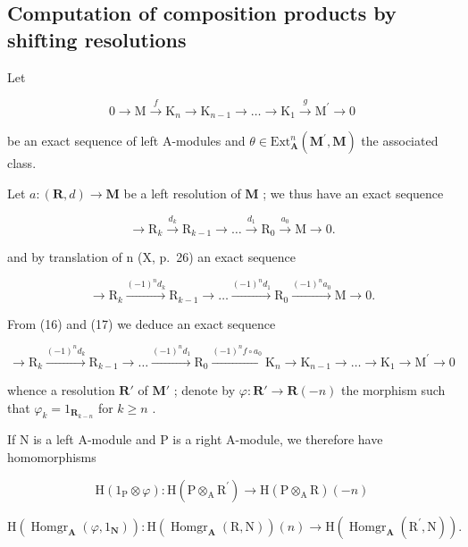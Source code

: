 \subsection{Computation of composition products by shifting resolutions}

Let

\[
0 \rightarrow \mathrm{M} \xrightarrow {f} \mathrm{K} _ {n} \rightarrow \mathrm{K} _ {n - 1} \rightarrow \dots \rightarrow \mathrm{K} _ {1} \xrightarrow {g} \mathrm{M} ^ {\prime} \rightarrow 0\tag{16}
\]

be an exact sequence of left A-modules and \(\theta\in\mathrm{Ext}_{\mathbf{A}}^{n}(\mathbf{M}^{\prime},\mathbf{M})\) the associated class.

Let \(a:(\mathbf{R},d)\to \mathbf{M}\) be a left resolution of \(\mathbf{M}\) ; we thus have an exact sequence

\[
\rightarrow \mathrm{R} _ {k} \xrightarrow {d _ {k}} \mathrm{R} _ {k - 1} \rightarrow \dots \xrightarrow {d _ {1}} \mathrm{R} _ {0} \xrightarrow {a _ {0}} \mathrm{M} \rightarrow 0.
\]

and by translation of n (X, p.~26) an exact sequence

\[
\rightarrow \mathrm{R} _ {k} \xrightarrow {(- 1) ^ {n} d _ {k}} \mathrm{R} _ {k - 1} \rightarrow \dots \xrightarrow {(- 1) ^ {n} d _ {1}} \mathrm{R} _ {0} \xrightarrow {(- 1) ^ {n} a _ {0}} \mathrm{M} \rightarrow 0.\tag{17}
\]

From (16) and (17) we deduce an exact sequence

\[
\rightarrow \mathrm{R} _ {k} \xrightarrow {(- 1) ^ {n} d _ {k}} \mathrm{R} _ {k - 1} \rightarrow \dots \xrightarrow {(- 1) ^ {n} d _ {1}} \mathrm{R} _ {0} \xrightarrow {(- 1) ^ {n} f \circ a _ {0}} \mathrm{K} _ {n} \rightarrow \mathrm{K} _ {n - 1} \rightarrow \dots \rightarrow \mathrm{K} _ {1} \rightarrow \mathrm{M} ^ {\prime} \rightarrow 0
\]

whence a resolution \(\mathbf{R}'\) of \(\mathbf{M}'\) ; denote by \(\varphi: \mathbf{R}' \to \mathbf{R}(-n)\) the morphism such that \(\varphi_k = 1_{\mathbf{R}_{k-n}}\) for \(k \geqslant n\) .

If N is a left A-module and P is a right A-module, we therefore have homomorphisms

\[
\mathrm{H} \left(1 _ {\mathrm{P}} \otimes \varphi\right): \mathrm{H} \left(\mathrm{P} \otimes_ {\mathrm{A}} \mathrm{R} ^ {\prime}\right)\rightarrow \mathrm{H} \left(\mathrm{P} \otimes_ {\mathrm{A}} \mathrm{R}\right) (- n)
\]

\[
\mathrm{H} \left(\operatorname{Homgr} _ {\mathbf {A}} (\varphi , 1 _ {\mathbf {N}})\right): \mathrm{H} \left(\operatorname{Homgr} _ {\mathbf {A}} (\mathrm{R}, \mathrm{N})\right) (n) \rightarrow \mathrm{H} \left(\operatorname{Homgr} _ {\mathbf {A}} \left(\mathrm{R} ^ {\prime}, \mathrm{N}\right)\right).
\]

